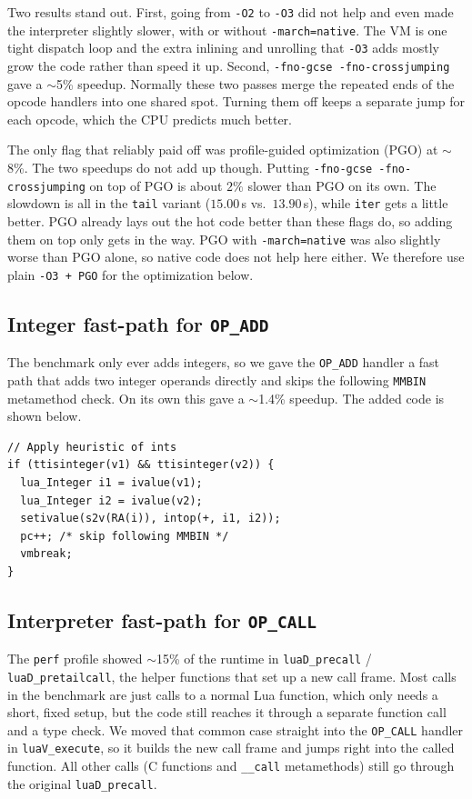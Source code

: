 \documentclass[a4paper]{article}
\begin{document}
Two results stand out. First, going from \texttt{-O2} to \texttt{-O3} did not help and even made the interpreter slightly slower, with or without \texttt{-march=native}. The VM is one tight dispatch loop and the extra inlining and unrolling that \texttt{-O3} adds mostly grow the code rather than speed it up. Second, \texttt{-fno-gcse -fno-crossjumping} gave a $\sim$5\% speedup. Normally these two passes merge the repeated ends of the opcode handlers into one shared spot. Turning them off keeps a separate jump for each opcode, which the CPU predicts much better.

The only flag that reliably paid off was profile-guided optimization (PGO) at $\sim$8\%. The two speedups do not add up though. Putting \texttt{-fno-gcse -fno-crossjumping} on top of PGO is about $2\%$ slower than PGO on its own. The slowdown is all in the \texttt{tail} variant ($15.00$\,s vs.\ $13.90$\,s), while \texttt{iter} gets a little better. PGO already lays out the hot code better than these flags do, so adding them on top only gets in the way. PGO with \texttt{-march=native} was also slightly worse than PGO alone, so native code does not help here either. We therefore use plain \texttt{-O3 + PGO} for the optimization below.

\subsection{Integer fast-path for \texttt{OP\_ADD}}
The benchmark only ever adds integers, so we gave the \texttt{OP\_ADD} handler a fast path that adds two integer operands directly and skips the following \texttt{MMBIN} metamethod check. On its own this gave a $\sim$1.4\% speedup. The added code is shown below.

\begin{verbatim}
// Apply heuristic of ints
if (ttisinteger(v1) && ttisinteger(v2)) {
  lua_Integer i1 = ivalue(v1);
  lua_Integer i2 = ivalue(v2);
  setivalue(s2v(RA(i)), intop(+, i1, i2));
  pc++; /* skip following MMBIN */
  vmbreak;
}
\end{verbatim}

\subsection{Interpreter fast-path for \texttt{OP\_CALL}}
The \texttt{perf} profile showed $\sim$15\% of the runtime in \texttt{luaD\_precall} / \texttt{luaD\_pretailcall}, the helper functions that set up a new call frame. Most calls in the benchmark are just calls to a normal Lua function, which only needs a short, fixed setup, but the code still reaches it through a separate function call and a type check. We moved that common case straight into the \texttt{OP\_CALL} handler in \texttt{luaV\_execute}, so it builds the new call frame and jumps right into the called function. All other calls (C functions and \texttt{\_\_call} metamethods) still go through the original \texttt{luaD\_precall}.
\end{document}
